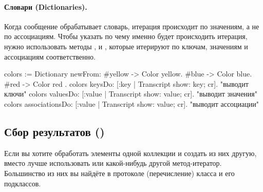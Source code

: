 \documentclass[a4paper,10pt,twoside]{book}
\begin{document}


\paragraph{Словари (Dictionaries).}
Когда сообщение  обрабатывает словарь, итерация происходит по значениям, а не по ассоциациям. Чтобы указать по чему именно будет происходить итерация, нужно использовать методы ,  и , которые итерируют по ключам, значениям и ассоциациям соответственно.

\begin{code}{}
colors := Dictionary newFrom: { #yellow -> Color yellow. #blue -> Color blue. #red -> Color red }.
colors keysDo: [:key | Transcript show: key; cr].                    "выводит ключи"
colors valuesDo: [:value | Transcript show: value; cr].            "выводит значения"
colors associationsDo: [:value | Transcript show: value; cr].  "выводит ассоциации"
\end{code}

\subsection{Сбор результатов ()}
Если вы хотите обработать элементы одной коллекции и создать из них другую, вместо  лучше использовать  или какой-нибудь другой метод-итератор.
Большинство из них вы найдёте в протоколе  (перечисление) класса  и его подклассов.
\end{document}
